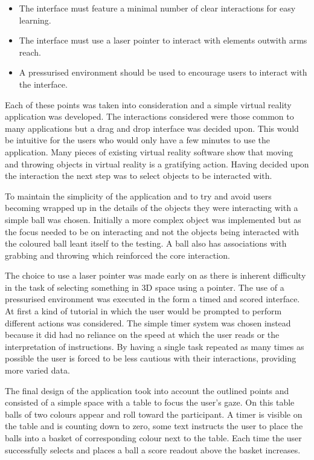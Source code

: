 \documentclass[12pt]{article}
\begin{document}
\begin{itemize}[noitemsep,topsep=0pt]
\item The interface must feature a minimal number of clear interactions for easy learning.
\item The interface must use a laser pointer to interact with elements outwith arms reach.
\item A pressurised environment should be used to encourage users to interact with the interface.
\end{itemize}

Each of these points was taken into consideration and a simple virtual reality application was developed. The interactions considered were those common to many applications but a drag and drop interface was decided upon. This would be intuitive for the users who would only have a few minutes to use the application. Many pieces of existing virtual reality software  show that moving and throwing objects in virtual reality is a gratifying action. Having decided upon the interaction the next step was to select objects to be interacted with.

To maintain the simplicity of the application and to try and avoid users becoming wrapped up in the details of the objects they were interacting with a simple ball was chosen. Initially a more complex object was implemented but as the focus needed to be on interacting and not the objects being interacted with the coloured ball leant itself to the testing. A ball also has associations with grabbing and throwing which reinforced the core interaction.

The choice to use a laser pointer was made early on as there is inherent difficulty in the task of selecting something in 3D space using a pointer. The use of a pressurised environment was executed in the form a timed and scored interface. At first a kind of tutorial in which the user would be prompted to perform different actions was considered. The simple timer system was chosen instead because it did had no reliance on the speed at which the user reads or the interpretation of instructions. By having a single task repeated as many times as possible the user is forced to be less cautious with their interactions, providing more varied data.

The final design of the application took into account the outlined points and consisted of a simple space with a table to focus the user's gaze. On this table balls of two colours appear and roll toward the participant. A timer is visible on the table and is counting down to zero, some text instructs the user to place the balls into a basket of corresponding colour next to the table. Each time the user successfully selects and places a ball a score readout above the basket increases.
\end{document}
